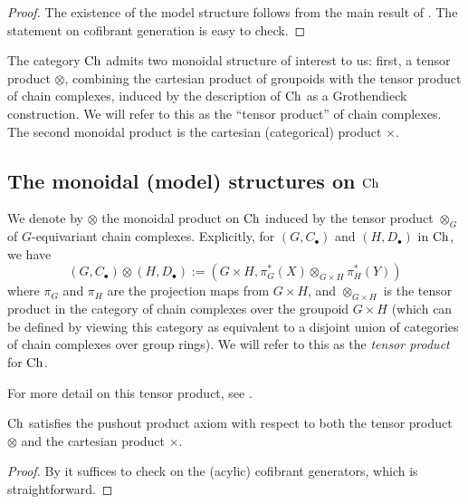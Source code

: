\documentclass[12pt]{amsart}
\begin{document}
\begin{proof}
	The existence of the model structure follows from the main result of \cite[Theorem 3.0.12]{Harpaz2014}. The statement on cofibrant generation is easy to check.
\end{proof}
The category ${\mathrm{Ch}}$ admits two monoidal structure of interest to us: first, a tensor product $\otimes$, combining the cartesian product of groupoids with the tensor product of chain complexes, induced by the description of ${\mathrm{Ch}}$ as a Grothendieck construction. 
We will refer to this as the ``tensor product'' of chain complexes.
The second monoidal product is the cartesian (categorical) product $\times$. 

\subsection{The monoidal (model) structures on ${\mathrm{Ch}}$}
\begin{definition}\label{dfn:tensor-product-on-chgpd}
	We denote by $\otimes$ the monoidal product on ${\mathrm{Ch}}$ induced by the tensor product $\otimes_G$ of $G$-equivariant chain complexes.
	Explicitly, for $(G,C_\bullet)$ and $(H, D_\bullet)$ in ${\mathrm{Ch}}$, we have 
	$$(G,C_\bullet) \otimes (H, D_\bullet) := (G \times H, \pi_G^*(X) \otimes_{G \times H} \pi_H^*(Y))$$
	where $\pi_G$ and $\pi_H$ are the projection maps from $G \times H$, 
	and $\otimes_{G \times H}$ is the tensor product in the category of chain complexes over the groupoid $G \times H$
	(which can be defined by viewing this category as equivalent to a disjoint union of categories of chain complexes over group rings).
	We will refer to this as the \emph{tensor product} for ${\mathrm{Ch}}$.
\end{definition}
For more detail on this tensor product, see \cite[Chapter 9]{Brown_Higgins_Sivera_2011}.

\begin{lemma}\label{lem:chgpd-pushout-product}
	${\mathrm{Ch}}$ satisfies the pushout product axiom with respect to both the tensor product $\otimes$ and the cartesian product $\times$.
\end{lemma}
\begin{proof}
	By \cite[Lemma 2.3]{SchwedeShipley1998} it suffices to check on the (acylic) cofibrant generators, which is straightforward.
\end{proof}
\end{document}
